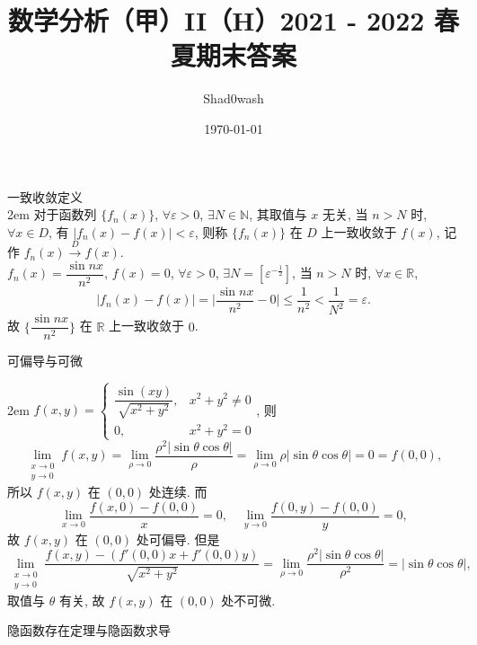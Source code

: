 \documentclass[UTF8,14pt,normal]{ctexart}
\title{数学分析（甲）II（H）2021 - 2022 春夏期末答案}
\author{Shad0wash}
\date{\today}
\begin{document}
\maketitle

 一致收敛定义 \\

    \hangindent 2em
    \noindent
    对于函数列 \(\{f_n(x)\}\), \(\forall \varepsilon > 0\), \(\exists N \in \mathbb{N}\), 其取值与 \(x\) 无关, 当 \(n > N\) 时, \(\forall x \in D\), 有 \(\lvert f_n(x) - f(x) \rvert < \varepsilon\), 则称 \(\{f_n(x)\}\) 在 \(D\) 上一致收敛于 \(f(x)\), 记作 \(f_n(x) \xrightarrow{D} f(x)\). \\
    \(f_n(x) = \dfrac{\sin nx}{n^2}\), \(f(x) = 0\), \(\forall \varepsilon > 0\), \(\exists N = \left[ \varepsilon^{-\frac{1}{2}} \right]\), 当 \(n > N\) 时, \(\forall x \in \mathbb{R}\), 
    \[
        \lvert f_n(x) - f(x) \rvert = \lvert \dfrac{\sin nx}{n^2} - 0 \rvert \leqslant \dfrac{1}{n^2} < \dfrac{1}{N^2} = \varepsilon.
    \]
    故 \(\{ \dfrac{\sin nx}{n^2} \}\) 在 \(\mathbb{R}\) 上一致收敛于 \(0\). 

 可偏导与可微

    \hangindent 2em
    \noindent
    \(f(x, y) = \begin{cases} \dfrac{\sin (xy)}{\sqrt{x^2 + y^2}}, & x^2 + y^2 \neq 0 \\ 0, & x^2 + y^2 = 0 \end{cases}\), 则
    \[
        \lim_{\substack{x \to 0 \\ y \to 0}} f(x, y) = \lim_{\rho \to 0} \dfrac{\rho^2 \lvert \sin \theta \cos \theta \rvert}{\rho} = \lim_{\rho \to 0} \rho \lvert \sin \theta \cos \theta \rvert = 0 = f(0, 0),
    \]
    所以 \(f(x, y)\) 在 \((0, 0)\) 处连续. 而
    \[
        \lim_{x \to 0} \dfrac{f(x, 0) - f(0, 0)}{x} = 0, \quad \lim_{y \to 0} \dfrac{f(0, y) - f(0, 0)}{y} = 0,
    \]
    故 \(f(x, y)\) 在 \((0, 0)\) 处可偏导. 但是
    \[
        \lim_{\substack{x \to 0 \\ y \to 0}} \dfrac{f(x, y) - (f'(0, 0) x + f'(0, 0) y)}{\sqrt{x^2 + y^2}} = \lim_{\rho \to 0} \dfrac{\rho^2 \lvert \sin \theta \cos \theta \rvert }{\rho^2} = \lvert \sin \theta \cos \theta \rvert,
    \]
    取值与 \(\theta\) 有关, 故 \(f(x, y)\) 在 \((0, 0)\) 处不可微.


 隐函数存在定理与隐函数求导
\end{document}
